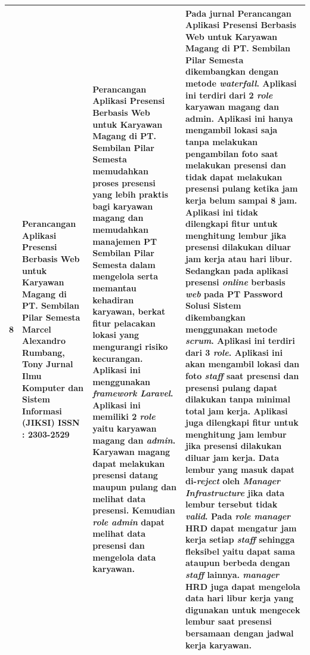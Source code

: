\begin{longtable}{ |p{0.5cm}|p{3cm}|p{7cm}|p{12cm}|  }
  8 & Perancangan Aplikasi Presensi Berbasis Web untuk
Karyawan Magang di PT. Sembilan Pilar Semesta
 \newline Marcel Alexandro Rumbang, Tony
 \newline Jurnal Ilmu Komputer dan Sistem Informasi (JIKSI)
 \newline ISSN : 2303-2529
 & Perancangan Aplikasi Presensi Berbasis Web untuk
Karyawan Magang di PT. Sembilan Pilar Semesta memudahkan proses presensi yang lebih praktis bagi karyawan magang dan memudahkan manajemen PT Sembilan Pilar Semesta dalam mengelola serta memantau kehadiran karyawan, berkat fitur pelacakan lokasi yang mengurangi risiko kecurangan. Aplikasi ini menggunakan \textit{framework Laravel}. Aplikasi ini memiliki 2 \textit{role} yaitu karyawan magang dan \textit{admin}. Karyawan magang dapat melakukan presensi datang maupun pulang dan melihat data presensi. Kemudian \textit{role admin} dapat melihat data presensi dan mengelola data karyawan.
 & Pada jurnal Perancangan Aplikasi Presensi Berbasis Web untuk
Karyawan Magang di PT. Sembilan Pilar Semesta dikembangkan dengan metode \textit{waterfall}. Aplikasi ini terdiri dari 2 \textit{role} karyawan magang dan admin. Aplikasi ini hanya mengambil lokasi saja tanpa melakukan pengambilan foto saat melakukan presensi dan tidak dapat melakukan presensi pulang ketika jam kerja belum sampai 8 jam. Aplikasi ini tidak dilengkapi fitur untuk menghitung lembur jika presensi dilakukan diluar jam kerja atau hari libur.
 \newline 
 \newline
 Sedangkan pada aplikasi presensi \textit{online} berbasis \textit{web} pada PT Password Solusi Sistem dikembangkan menggunakan metode \textit{scrum}. Aplikasi ini terdiri dari 3 \textit{role}. Aplikasi ini akan mengambil lokasi dan foto \textit{staff} saat presensi dan presensi pulang dapat dilakukan tanpa minimal total jam kerja. Aplikasi juga dilengkapi fitur untuk menghitung jam lembur jika presensi dilakukan diluar jam kerja. Data lembur yang masuk dapat di-\textit{reject} oleh \textit{Manager Infrastructure} jika data lembur tersebut tidak \textit{valid}. Pada \textit{role manager} HRD dapat mengatur jam kerja setiap \textit{staff} sehingga fleksibel yaitu dapat sama ataupun berbeda dengan \textit{staff} lainnya. \textit{manager} HRD juga dapat mengelola data hari libur kerja yang digunakan untuk mengecek lembur saat presensi bersamaan dengan jadwal kerja karyawan.
 \\ \hline
\end{longtable}


